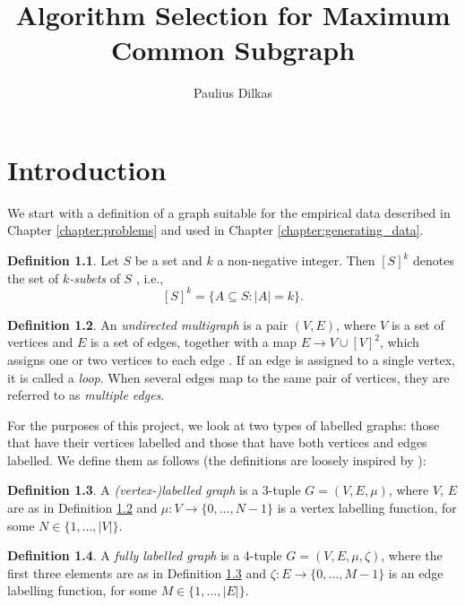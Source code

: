 \documentclass{l4proj}
\title{Algorithm Selection for Maximum Common Subgraph}
\author{Paulius Dilkas}
\theoremstyle{definition}
\newtheorem{definition}{Definition}[chapter]
\theoremstyle{remark}
\begin{document}
\maketitle


\educationalconsent
\tableofcontents

\chapter{Introduction}

We start with a definition of a graph suitable for the empirical data described
in Chapter \ref{chapter:problems} and used in Chapter
\ref{chapter:generating_data}.

\begin{definition}
  Let $S$ be a set and $k$ a non-negative integer. Then $[S]^k$ denotes
  the set of \emph{$k$-subets} of $S$ \cite{subset}, i.e.,
  \[ [S]^k = \{ A \subseteq S : |A| = k \}. \]
\end{definition}

\begin{definition} \label{def:graph}
  An \emph{undirected multigraph} is a pair $(V, E)$, where $V$ is a set of
  vertices and $E$ is a set of edges, together with a map $E \to V \cup [V]^2$,
  which assigns one or two vertices to each edge
  \cite{DBLP:books/daglib/0030488}. If an edge is assigned to a single vertex,
  it is called a \emph{loop}. When several edges map to the same pair of
  vertices, they are referred to as \emph{multiple edges}. 
\end{definition}

For the purposes of this project, we look at two types of labelled graphs: those
that have their vertices labelled and those that have both vertices and edges
labelled. We define them as follows (the definitions are loosely inspired by
\cite{abu-aisheh_2016}):

\begin{definition} \label{def:vertex_label}
  A \emph{(vertex-)labelled graph} is a 3-tuple $G = (V, E, \mu)$, where $V$,
  $E$ are as in Definition \ref{def:graph} and $\mu \colon V \to \{ 0, \dots, N
  - 1 \}$ is a vertex labelling function, for some $N \in \{1, \dots, |V| \}$.
\end{definition}

\begin{definition} \label{def:edge_label}
  A \emph{fully labelled graph} is a 4-tuple $G = (V, E, \mu, \zeta)$, where the
  first three elements are as in Definition \ref{def:vertex_label} and $\zeta
  \colon E \to \{ 0, \dots, M - 1 \}$ is an edge labelling function, for some $M
  \in \{ 1, \dots, |E| \}$.
\end{definition}
\end{document}
